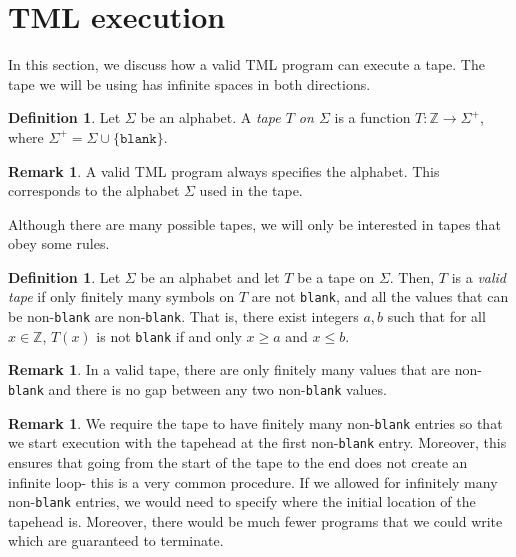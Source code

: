 \documentclass{amsart}
\theoremstyle{definition}
\newtheorem{definition}[rules]{Definition}
\newtheorem{remark}[rules]{Remark}
\begin{document}
    \section{TML execution}
    In this section, we discuss how a valid TML program can execute a tape. The tape we will be using has infinite spaces in both directions.
    \begin{definition}
        Let $\Sigma$ be an alphabet. A \emph{tape $T$ on $\Sigma$} is a function $T: \mathbb{Z} \to \Sigma^+$, where $\Sigma^+ = \Sigma \cup \{\texttt{blank}\}$.
    \end{definition}
    \begin{remark}
        A valid TML program always specifies the alphabet. This corresponds to the alphabet $\Sigma$ used in the tape.
    \end{remark}
    \noindent Although there are many possible tapes, we will only be interested in tapes that obey some rules.
    \begin{definition}
        Let $\Sigma$ be an alphabet and let $T$ be a tape on $\Sigma$. Then, $T$ is a \emph{valid tape} if only finitely many symbols on $T$ are not \texttt{blank}, and all the values that can be non-\texttt{blank} are non-\texttt{blank}. That is, there exist integers $a, b$ such that for all $x \in \mathbb{Z}$, $T(x)$ is not \texttt{blank} if and only $x \geq a$ and $x \leq b$.
    \end{definition}
    \begin{remark}
        In a valid tape, there are only finitely many values that are non-\texttt{blank} and there is no gap between any two non-\texttt{blank} values.
    \end{remark}
    \begin{remark}
        We require the tape to have finitely many non-\texttt{blank} entries so that we start execution with the tapehead at the first non-\texttt{blank} entry. Moreover, this ensures that going from the start of the tape to the end does not create an infinite loop- this is a very common procedure. If we allowed for infinitely many non-\texttt{blank} entries, we would need to specify where the initial location of the tapehead is. Moreover, there would be much fewer programs that we could write which are guaranteed to terminate.
    \end{remark}
\end{document}
